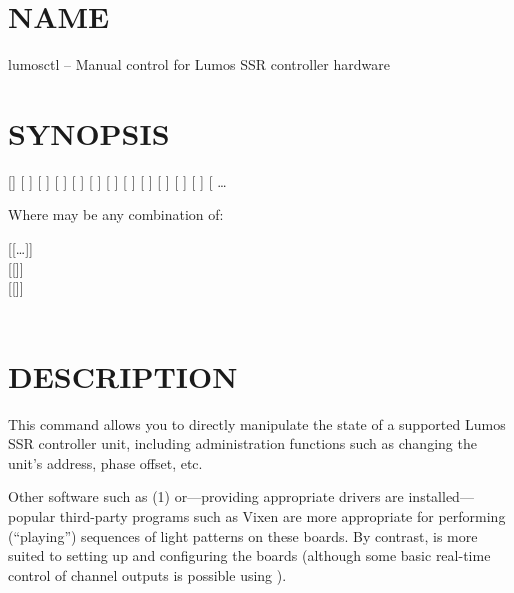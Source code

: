 \section*{NAME}
lumosctl -- Manual control for Lumos SSR controller hardware
\section*{SYNOPSIS}
[]
[
]
[
]
[
]
[
]
[
]
[
]
[
]
[
]
[
]
[
]
[
]
[
\codetype{:}\codetype{:}\Var*{term\textnormal{]}}
\dots 


Where
may be any combination of:
\begin{center}


[[\codetype{,}\dots ]]
\\
[[]]
\\
[[]]
\\
\\
\end{center}
\section*{DESCRIPTION}


This command allows you to directly manipulate the state of a
supported Lumos
SSR controller unit, including administration functions
such as changing the unit's address, phase offset, etc.


Other software such as 
(1)
or---providing appropriate drivers are installed---popular
third-party programs such as Vixen are more appropriate for
performing (``playing'') sequences of light patterns on
these boards.  By contrast, 
is more suited to setting up and configuring the boards (although some
basic real-time control of channel outputs is possible using
).



